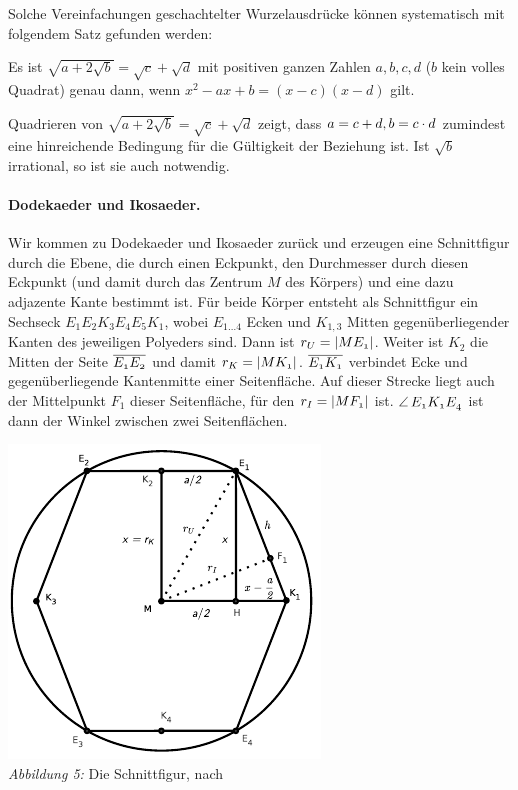 \documentclass[11pt]{article}
\begin{document}
Solche Vereinfachungen geschachtelter Wurzelausdrücke können systematisch mit
folgendem Satz gefunden werden:  

\begin{satz}
  Es ist $\sqrt{a+2\sqrt{b}}=\sqrt{c}+\sqrt{d}$ mit positiven ganzen Zahlen
  $a,b,c,d$ ($b$ kein volles Quadrat) genau dann, wenn $x^2-ax+b=(x-c)(x-d)$
  gilt.
\end{satz}

\begin{beweis}
  Quadrieren von $\sqrt{a+2\sqrt{b}}=\sqrt{c}+\sqrt{d}$ zeigt, dass $a=c+d,
  b=c\cdot d$ zumindest eine hinreichende Bedingung für die Gültigkeit der
  Beziehung ist.  Ist $\sqrt{b}$ irrational, so ist sie auch notwendig.
\end{beweis}

\paragraph{Dodekaeder und Ikosaeder.}
Wir kommen zu Dodekaeder und Ikosaeder zurück und erzeugen eine Schnittfigur
durch die Ebene, die durch einen Eckpunkt, den Durchmesser durch diesen
Eckpunkt (und damit durch das Zentrum $M$ des Körpers) und eine dazu adjazente
Kante bestimmt ist.  Für beide Körper entsteht als Schnittfigur ein Sechseck
$E_1E_2K_3E_4E_5K_1$, wobei $E_{1\dots4}$ Ecken und $K_{1,3}$ Mitten
gegenüberliegender Kanten des jeweiligen Polyeders sind.  Dann ist
$r_U=\left\vert {\mathnormal{ME_1}}\right\vert$.  Weiter ist $K_2$ die Mitten der Seite
$\overline{{\mathnormal{E_1E_2}}}$ und damit $r_K=\left\vert {\mathnormal{MK_1}}\right\vert$.  $\overline{{\mathnormal{E_1K_1}}}$
verbindet Ecke und gegenüberliegende Kantenmitte einer Seitenfläche. Auf
dieser Strecke liegt auch der Mittelpunkt $F_1$ dieser Seitenfläche, für den
$r_I=\left\vert {\mathnormal{MF_1}}\right\vert$ ist. $\kangle{E_1K_1E_4}$ ist dann der Winkel zwischen
zwei Seitenflächen. 

\begin{center}
  \includegraphics[width=.5\textwidth]{graebe-05-1/Schnittfigur.pdf}\\
  \emph{Abbildung 5:} Die Schnittfigur, nach \cite{Fendt1}
\end{center}
\end{document}
